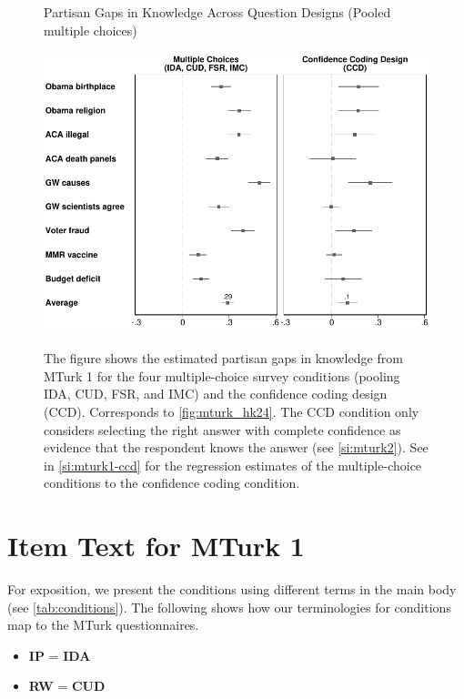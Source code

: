 \clearpage
\begin{center}
	\begin{figure}[ht]
		\centering
		\caption{Partisan Gaps in Knowledge Across Question Designs (Pooled multiple choices)}
		\includegraphics[width=.9\textwidth]{../figs/partisan-gap-by-item-arm-mc-24k.pdf}
		\label{fig:mturk_hk24_mc}
		\caption*{\footnotesize
		The figure shows the estimated partisan gaps in knowledge from MTurk 1 for the four multiple-choice survey conditions (pooling IDA, CUD, FSR, and IMC) and the confidence coding design (CCD). Corresponds to \cref{fig:mturk_hk24}.
            The CCD condition only considers selecting the right answer with complete confidence as evidence that the respondent knows the answer (see \cref{si:mturk2}).
            See  in \cref{si:mturk1-ccd} for the regression estimates of the multiple-choice conditions to the confidence coding condition.
		}
	\end{figure}
\end{center}

\clearpage
\section{Item Text for MTurk 1}\label{si:mturk1}
For exposition, we present the conditions using different terms in the main body (see \cref{tab:conditions}). The following shows how our terminologies for conditions map to the MTurk questionnaires.

\begin{itemize}
    \item{\textbf{IP} = \textbf{IDA}} 
    \item{\textbf{RW} = \textbf{CUD}} 
\end{itemize}

